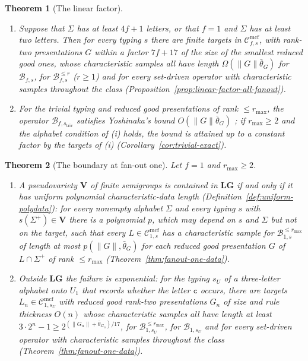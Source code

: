 \documentclass[11pt]{article}
\numberwithin{equation}{section}
\theoremstyle{plain}
\theoremstyle{definition}
\theoremstyle{remark}
\newcommand{\Cmcf}[2]{\mathcal{C}^{\mathrm{mcf}}_{#1,#2}}
\theoremstyle{plain}
\newtheorem{mainthm}{Theorem}
\begin{document}
\begin{mainthm}[The linear factor]
\label{thm:B}
\begin{enumerate}[label=\textup{(\roman*)},leftmargin=*]
\item Suppose that $\Sigma$ has at least $4f+1$ letters, or that $f=1$ and
$\Sigma$ has at least two letters.  Then for every typing $s$ there are finite
targets in $\Cmcf{f}{s}$, with rank-two presentations $G$ within a factor
$7f+17$ of the size of the smallest reduced good ones, whose characteristic
samples all have length $\Omega(\|G\|\bar\theta_G)$ for $\mathcal B_{f,s}$, for
$\mathcal B^{\le r}_{f,s}$ \textup($r\ge1$\textup) and for every set-driven
operator with characteristic samples throughout the class
\textup(Proposition~\ref{prop:linear-factor-all-fanout}\textup).
\item For the trivial typing and reduced good presentations of rank
$\le r_{\max}$, the operator $\mathcal B_{f,s_{\mathrm{triv}}}$ satisfies
Yoshinaka's bound $O(\|G\|\bar\theta_G)$ \cite{Yoshinaka2011}; if
$r_{\max}\ge2$ and the alphabet condition of \textup{(i)} holds, the bound is
attained up to a constant factor by the targets of \textup{(i)}
\textup(Corollary~\ref{cor:trivial-exact}\textup).
\end{enumerate}
\end{mainthm}

\begin{mainthm}[The boundary at fan-out one]
\label{thm:C}
Let $f=1$ and $r_{\max}\ge2$.
\begin{enumerate}[label=\textup{(\roman*)},leftmargin=*]
\item A pseudovariety $\mathbf V$ of finite semigroups is contained in
$\mathbf{LG}$ if and only if it has \emph{uniform polynomial
characteristic-data length} \textup(Definition~\ref{def:uniform-polydata}\textup):
for every nonempty alphabet $\Sigma$ and every typing $s$ with $s(\Sigma^+)\in\mathbf V$
there is a polynomial $p$, which may depend on $s$ and $\Sigma$ but not on the
target, such that every $L\in\Cmcf{1}{s}$ has a characteristic sample for
$\mathcal B^{\le r_{\max}}_{1,s}$ of length at most $p(\|G\|,\bar\theta_G)$ for
each reduced good presentation $G$ of $L\cap\Sigma^+$ of rank $\le r_{\max}$
\textup(Theorem~\ref{thm:fanout-one-data}\textup).
\item Outside $\mathbf{LG}$ the failure is exponential: for the typing $s_U$
of a three-letter alphabet onto $U_1$ that records whether the letter
$\mathtt c$ occurs, there are targets $L_n\in\Cmcf{1}{s_U}$ with reduced good
rank-two presentations $G_n$ of size and rule thickness $O(n)$ whose
characteristic samples all have length at least
$3\cdot2^n-1\ge2^{(\|G_n\|+\bar\theta_{G_n})/17}$, for
$\mathcal B^{\le r_{\max}}_{1,s_U}$, for $\mathcal B_{1,s_U}$ and for every
set-driven operator with characteristic samples throughout the class
\textup(Theorem~\ref{thm:fanout-one-data}\textup).
\end{enumerate}
\end{mainthm}
\end{document}
